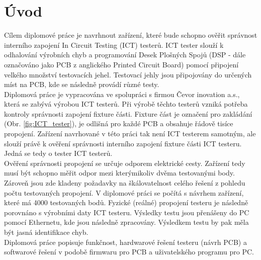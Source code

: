 \chapter*{Úvod}
{}

\indent Cílem diplomové práce je navrhnout zařízení,
které bude schopno ověřit správnost interního zapojení In Circuit Testing (ICT) testerů.
ICT tester slouží k odhalování výrobních chyb a programování Desek Plošných Spojů (DSP - dále
označováno jako PCB z anglického Printed Circuit Board)
pomocí připojení velkého množství testovacích jehel. Testovací jehly jsou připojovány do určených
míst na PCB, kde se následně provádí různé testy.\\

Diplomová práce je vypracována ve spolupráci s firmou Čevor inovation a.s.,
která se zabývá výrobou ICT testerů. Při výrobě těchto testerů vzniká potřeba kontroly správnosti zapojení fixture části.
Fixture část je označení pro zakládání (Obr. \ref{fig:ICT_tester}), je odlišná pro každé PCB a obsahuje řádově tisíce propojení.
Zařízení navrhované v této práci tak není ICT testerem samotným,
ale slouží právě k ověření správnosti interního zapojení fixture části ICT testeru.
Jedná se tedy o tester ICT testerů.\\

Ověření správnosti propojení se určuje odporem elektrické cesty.
Zařízení tedy musí být schopno měřit odpor mezi kterýmikoliv dvěma testovanými body.
Zároveň jsou zde kladeny požadavky na škálovatelnost celého řešení z pohledu počtu testovaných propojení.
V diplomové práci se počítá s návrhem zařízení, které má 4000 testovaných bodů.
Fyzické (reálné) propojení testeru je následně porovnáno s výrobními daty ICT testeru.
Výsledky testu jsou přenášeny do PC pomocí Ethernetu,
kde jsou následně zpracovány. Výsledkem testu by pak měla být jasná identifikace chyb.\\

Diplomová práce popisuje funkčnost, hardwarové řešení testeru (návrh PCB) a softwarové řešení v
podobě firmwaru pro PCB a uživatelského programu pro PC. 
